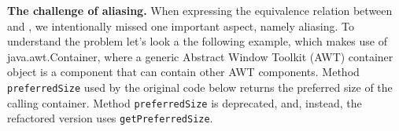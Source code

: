\documentclass[10pt,conference]{IEEEtran}
\begin{document}

{\bf The challenge of aliasing.}
%
When expressing the equivalence relation between  and , we
intentionally missed one important aspect, namely aliasing.  To understand
the problem let's look a the following example, which makes use of
java.awt.Container, where a generic Abstract Window Toolkit (AWT) container
object is a component that can contain other AWT components.  Method
\texttt{preferredSize} used by the original code below returns the preferred
size of the calling container. Method
\texttt{preferredSize} is deprecated, and, instead, the refactored version
uses \texttt{getPreferredSize}.

\end{document}
